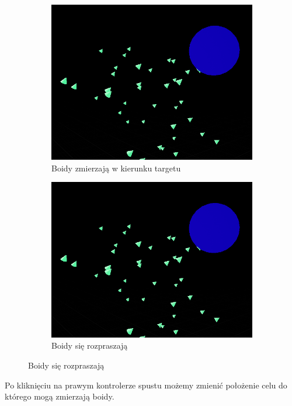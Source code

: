 \documentclass[a4paper,12pt,reqno]{article}
\begin{document}
\begin{figure}[H]%
	\centering
	\begin{subfigure}{.5\textwidth}
		\centering
		\includegraphics[width=0.8\linewidth]{graphics//boids/BoidsInUE.png}
		\caption{Boidy zmierzają w kierunku targetu }	
		\label{ref:subref_a}
	\end{subfigure}%
	\begin{subfigure}{.5\textwidth}
		\centering
		\includegraphics[width=0.8\linewidth]{graphics//boids/BoidsInUE.png}
		\caption{Boidy się rozpraszają}
		\label{ref:subref_b}
	\end{subfigure}%
\label{ref:ref}
\end{figure}

Po kliknięciu na prawym kontrolerze spustu możemy zmienić położenie celu do którego mogą zmierzają boidy.
\end{document}
